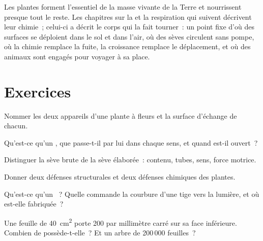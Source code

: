 \begin{remark}\label{rem:g12:plant-rooted-life:half}
Les plantes forment l'essentiel de la masse vivante de la Terre et
nourrissent presque tout le reste. Les chapitres sur la 
et la respiration qui suivent décrivent leur chimie~; celui-ci a
décrit le corps qui la fait tourner~: un point fixe d'où des surfaces
se déploient dans le sol et dans l'air, où des sèves circulent sans
pompe, où la chimie remplace la fuite, la croissance remplace le
déplacement, et où des animaux sont engagés pour voyager à sa place.
\end{remark}

\section{Exercices}

\begin{exercise}[$\star$]\label{exo:g12:plant-rooted-life:1}
Nommer les deux appareils d'une plante à fleurs et la surface
d'échange de chacun.
\end{exercise}

\begin{exercise}[$\star$]\label{exo:g12:plant-rooted-life:2}
Qu'est-ce qu'un , que passe-t-il par lui dans chaque sens, et
quand est-il ouvert~?
\end{exercise}

\begin{exercise}[$\star$]\label{exo:g12:plant-rooted-life:3}
Distinguer la sève brute de la sève élaborée~: contenu, tubes, sens,
force motrice.
\end{exercise}

\begin{exercise}[$\star$]\label{exo:g12:plant-rooted-life:4}
Donner deux défenses structurales et deux défenses chimiques des
plantes.
\end{exercise}

\begin{exercise}[$\star$]\label{exo:g12:plant-rooted-life:5}
Qu'est-ce qu'un ~? Quelle  commande la courbure d'une
tige vers la lumière, et où est-elle fabriquée~?
\end{exercise}

\begin{exercise}[$\star\star$]\label{exo:g12:plant-rooted-life:6}
Une feuille de \qty{40}{cm^2} porte 200  par millimètre carré
sur sa face inférieure. Combien de  possède-t-elle~? Et un
arbre de 200\,000 feuilles~?
\end{exercise}

